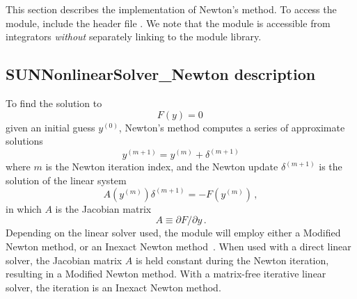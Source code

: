 This section describes the {\sunnonlinsol} implementation of Newton's method. To
access the {\sunnonlinsolnewton} module, include the header file
. We note that the {\sunnonlinsolnewton}
module is accessible from {\sundials} integrators \textit{without} separately
linking to the  module library.

\subsection{SUNNonlinearSolver\_Newton description}
\label{ss:sunnonlinsolnewton_math}

To find the solution to
\begin{equation}\label{e:newton_sys}
  F(y) = 0 \,
\end{equation}
given an initial guess $y^{(0)}$, Newton's method computes a series of
approximate solutions
\begin{equation}
  y^{(m+1)} = y^{(m)} + \delta^{(m+1)}
\end{equation}
where $m$ is the Newton iteration index, and the Newton update $\delta^{(m+1)}$
is the solution of the linear system
\begin{equation}\label{e:newton_linsys}
  A(y^{(m)}) \delta^{(m+1)} = -F(y^{(m)}) \, ,
\end{equation}
in which $A$ is the Jacobian matrix
\begin{equation}\label{e:newton_mat}
  A \equiv \partial F / \partial y \, .
\end{equation}
Depending on the linear solver used, the {\sunnonlinsolnewton} module
will employ either a Modified Newton method, or an Inexact Newton
method~\cite{Bro:87,BrSa:90,DES:82,DeSc:96,Kel:95}. When used with a direct
linear solver, the Jacobian matrix $A$ is held constant during the Newton
iteration, resulting in a Modified Newton method. With a matrix-free iterative
linear solver, the iteration is an Inexact Newton method.

